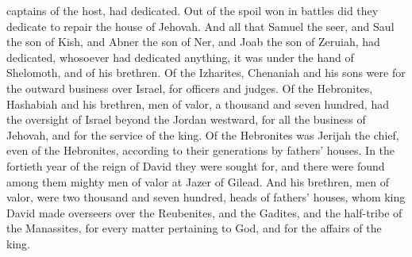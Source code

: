 captains of the host, had dedicated. Out of the spoil won in battles did they dedicate to repair the house of Jehovah. And all that Samuel the seer, and Saul the son of Kish, and Abner the son of Ner, and Joab the son of Zeruiah, had dedicated, whosoever had dedicated anything, it was under the hand of Shelomoth, and of his brethren.  Of the Izharites, Chenaniah and his sons were for the outward business over Israel, for officers and judges. Of the Hebronites, Hashabiah and his brethren, men of valor, a thousand and seven hundred, had the oversight of Israel beyond the Jordan westward, for all the business of Jehovah, and for the service of the king. Of the Hebronites was Jerijah the chief, even of the Hebronites, according to their generations by fathers’ houses. In the fortieth year of the reign of David they were sought for, and there were found among them mighty men of valor at Jazer of Gilead. And his brethren, men of valor, were two thousand and seven hundred, heads of fathers’ houses, whom king David made overseers over the Reubenites, and the Gadites, and the half-tribe of the Manassites, for every matter pertaining to God, and for the affairs of the king. 

